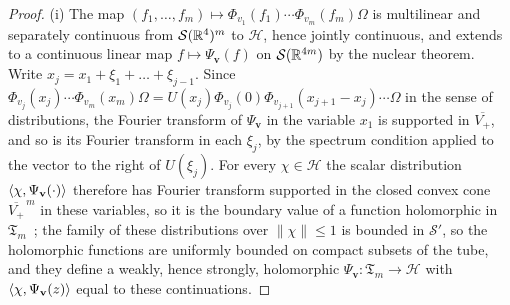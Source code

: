 \begin{proof}
(i) The map $(f_1,\dots,f_m)\mapsto\Phi_{v_1}(f_1)\cdots\Phi_{v_m}(f_m)\Omega$
is multilinear and separately continuous from $\mathcal S(\mathbb{R}^4)^m$ to
$\mathcal H$, hence jointly continuous, and extends to a continuous linear map
$f\mapsto\Psi_{\mathbf v}(f)$ on $\mathcal S(\mathbb{R}^{4m})$ by the nuclear
theorem. Write $x_j=x_1+\xi_1+\dots+\xi_{j-1}$. Since $\Phi_{v_j}(x_j)\cdots
\Phi_{v_m}(x_m)\Omega=U(x_j)\Phi_{v_j}(0)\Phi_{v_{j+1}}(x_{j+1}-x_j)\cdots\Omega$
in the sense of distributions, the Fourier transform of $\Psi_{\mathbf v}$ in
the variable $x_1$ is supported in $\overline{V_+}$, and so is its Fourier
transform in each $\xi_j$, by the spectrum condition applied to the vector
to the right of $U(\xi_j)$. For every $\chi\in\mathcal H$ the scalar
distribution $\langle \chi,\Psi_{\mathbf v}(\cdot)\rangle$ therefore has Fourier
transform supported in the closed convex cone $\overline{V_+}^{\,m}$ in these
variables, so it is the boundary value of a function holomorphic in
$\mathfrak T_m$~\cite[Thm.~2-8]{SW64}; the family of these distributions over
$\|\chi\|\le1$ is bounded in $\mathcal S'$, so the holomorphic functions are
uniformly bounded on compact subsets of the tube, and they define a weakly,
hence strongly, holomorphic $\Psi_{\mathbf v}:\mathfrak T_m\to\mathcal H$ with
$\langle \chi,\Psi_{\mathbf v}(z)\rangle$ equal to these continuations.


\end{proof}
